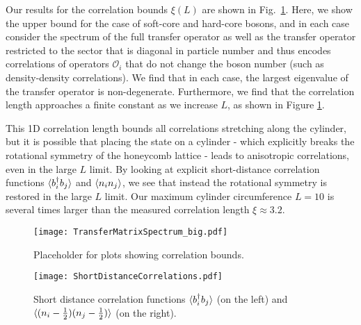 Our results for the correlation bounds $\xi(L)$ are shown in Fig.~\ref{fig:TMS}.
Here, we show the upper bound for the case of soft-core and hard-core bosons,
and in each case consider the spectrum of the full transfer operator as well
as the transfer operator restricted to the sector that is diagonal in particle
number and thus encodes correlations of operators $\mathcal{O}_i$ that do not
change the boson number (such as density-density correlations).
We find that in each case, the largest eigenvalue of the transfer operator is
non-degenerate. Furthermore, we find
that the correlation length approaches a finite constant as we
increase $L$, as shown in Figure \ref{fig:TMS}.

This 1D correlation length bounds all correlations stretching along
the cylinder, but it is possible that placing the state on a cylinder
- which explicitly breaks the rotational symmetry of the honeycomb
lattice - leads to anisotropic correlations, even in the large $L$
limit. By looking at explicit short-distance correlation functions
$\langle b_i^{\dagger} b_j \rangle$ and $\langle n_i n_j \rangle$, we see that instead the
rotational symmetry is restored in the large $L$ limit. Our maximum
cylinder circumference $L=10$ is several times larger than the
measured correlation length $\xi \approx 3.2$.

\begin{figure}[hbtc]
	\centering
	\texttt{[image: TransferMatrixSpectrum\_big.pdf]}
	\caption{Placeholder for plots showing correlation bounds.}
	\label{fig:TMS}
\end{figure}

\begin{figure}[hbtc]
	\centering
	\texttt{[image: ShortDistanceCorrelations.pdf]}
	\vskip-3cm %
	\caption{ Short distance correlation functions $\langle b_i^{\dagger} b_j \rangle$ (on the left) and $\langle (n_i-\frac12)(n_j-\frac12) \rangle$ (on the right). }
	\label{fig:ShortCorr}
\end{figure}
